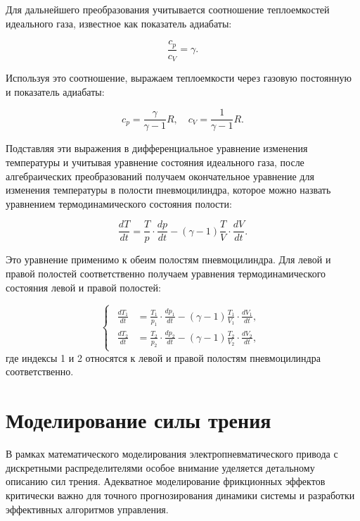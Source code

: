 Для дальнейшего преобразования учитывается соотношение теплоемкостей идеального газа, известное как показатель адиабаты:

\begin{equation*}
    \frac{c_p}{c_V} = \gamma.
\end{equation*}

Используя это соотношение, выражаем теплоемкости через газовую постоянную и показатель адиабаты:

\begin{equation*}
    c_p = \frac{\gamma}{\gamma - 1} R, \quad c_V = \frac{1}{\gamma - 1} R.
\end{equation*}

Подставляя эти выражения в дифференциальное уравнение изменения температуры и учитывая уравнение состояния идеального газа, после алгебраических преобразований получаем окончательное уравнение для изменения температуры в полости пневмоцилиндра, которое можно назвать уравнением термодинамического состояния полости:

\begin{equation*}
    \frac{dT}{dt} = \frac{T}{p} \cdot \frac{dp}{dt} - (\gamma - 1) \frac{T}{V} \cdot \frac{dV}{dt}.
\end{equation*}

Это уравнение применимо к обеим полостям пневмоцилиндра. Для левой и правой полостей соответственно
получаем уравнения термодинамического состояния левой и правой полостей:

\begin{equation}\label{eq:ch2/eq_temperature_system}
    \begin{cases}
        \begin{aligned}
            \frac{dT_1}{dt} & = \frac{T_1}{p_1} \cdot \frac{dp_1}{dt} - (\gamma - 1) \frac{T_1}{V_1} \cdot \frac{dV_1}{dt}, \\
            \frac{dT_2}{dt} & = \frac{T_2}{p_2} \cdot \frac{dp_2}{dt} - (\gamma - 1) \frac{T_2}{V_2} \cdot \frac{dV_2}{dt},
        \end{aligned}
    \end{cases}
\end{equation}
где индексы 1 и 2 относятся к левой и правой полостям пневмоцилиндра соответственно.



\section{Моделирование силы трения}\label{sec:ch2/sec2/subsec4}
В рамках математического моделирования электропневматического привода с
дискретными распределителями особое внимание уделяется детальному описанию сил трения.
Адекватное моделирование фрикционных эффектов критически важно для
точного прогнозирования динамики системы и разработки
эффективных алгоритмов управления.

